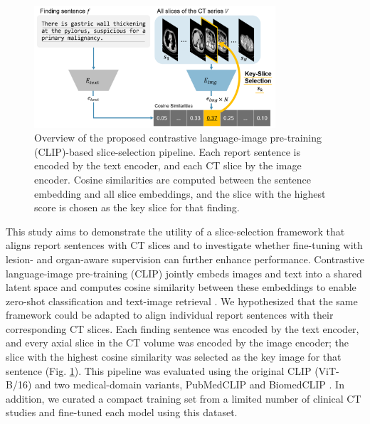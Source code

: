 \documentclass[bioengineering,article,submit,pdftex,moreauthors]{Definitions/mdpi}
\begin{document}
\begin{figure}[ht]
  \centering
  \includegraphics[width=0.8\textwidth]{./figures/figure1_9.png}
  \caption{
    Overview of the proposed contrastive language-image pre-training (CLIP)-based slice-selection pipeline. 
    Each report sentence is encoded by the text encoder, and each CT slice by the image encoder. 
    Cosine similarities are computed between the sentence embedding and all slice embeddings, and the slice with the highest score is chosen as the key slice for that finding. 
}
  \label{fig:clip_overview}
\end{figure}


This study aims to demonstrate the utility of a slice-selection framework that aligns report sentences with CT slices and to investigate whether fine-tuning with lesion- and organ-aware supervision can further enhance performance.
Contrastive language-image pre-training (CLIP) jointly embeds images and text into a shared latent space and computes cosine similarity between these embeddings to enable zero-shot classiﬁcation and text-image retrieval \cite{radford_learning_2021}. 
We hypothesized that the same framework could be adapted to align individual report sentences with their corresponding CT slices. 
Each finding sentence was encoded by the text encoder, and every axial slice in the CT volume was encoded by the image encoder; the slice with the highest cosine similarity was selected as the key image for that sentence (Fig. \ref{fig:clip_overview}). 
This pipeline was evaluated using the original CLIP (ViT-B/16) and two medical-domain variants, PubMedCLIP and BiomedCLIP \cite{radford_learning_2021,eslami_pubmedclip_2023,zhang_biomedclip_2025}. 
In addition, we curated a compact training set from a limited number of clinical CT studies and fine-tuned each model using this dataset. 
\end{document}
